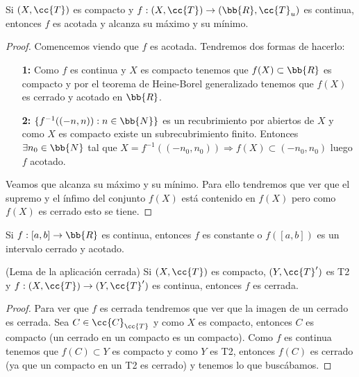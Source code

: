 \begin{coro}
    Si $(X, \cc{T})$ es compacto y $f:(X, \cc{T})\to (\bb{R}, \cc{T}_u)$ es continua, entonces $f$ es acotada y alcanza su máximo y su mínimo.
    \begin{proof}
        Comencemos viendo que $f$ es acotada. Tendremos dos formas de hacerlo:

        \begin{itemize}
            \item[\textbf{1: }] Como $f$ es continua y $X$ es compacto tenemos que $f(X)\subset \bb{R}$ es compacto y por el teorema de Heine-Borel generalizado tenemos que $f(X)$ es cerrado y acotado en $\bb{R}$.
            \item[\textbf{2: }] $\{f^{-1}((-n,n)):n\in \bb{N}\}$ es un recubrimiento por abiertos de $X$ y como $X$ es compacto existe un subrecubrimiento finito. Entonces $\exists n_0\in \bb{N}$ tal que $X=f^{-1}((-n_0, n_0)) \Rightarrow f(X)\subset (-n_0, n_0)$ luego $f$ acotado.
        \end{itemize}
        
        Veamos que alcanza su máximo y su mínimo. Para ello tendremos que ver que el supremo y el ínfimo del conjunto $f(X)$ está contenido en $f(X)$ pero como $f(X)$ es cerrado esto se tiene.

    \end{proof}
\end{coro}

\begin{coro}
    Si $f:[a,b]\to \bb{R}$ es continua, entonces $f$ es constante o $f([a,b])$ es un intervalo cerrado y acotado.
    \endsquare
\end{coro}

\begin{prop}
    (Lema de la aplicación cerrada) Si $(X, \cc{T})$ es compacto, $(Y, \cc{T}')$ es T2 y $f:(X, \cc{T})\to (Y, \cc{T}')$ es continua, entonces $f$ es cerrada.
    \begin{proof}
        Para ver que $f$ es cerrada tendremos que ver que la imagen de un cerrado es cerrada. Sea $C\in \cc{C}_{\cc{T}}$ y como $X$ es compacto, entonces $C$ es compacto (un cerrado en un compacto es un compacto). Como $f$ es continua tenemos que $f(C)\subset Y$ es compacto y como $Y$ es T2, entonces $f(C)$ es cerrado (ya que un compacto en un T2 es cerrado) y tenemos lo que buscábamos.

    \end{proof}
\end{prop}

